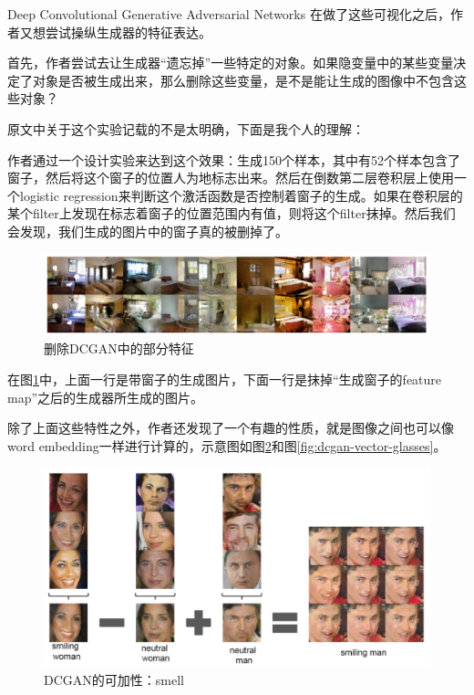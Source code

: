 \documentclass{ctexart}
\begin{document}
\begin{section}{Deep Convolutional Generative Adversarial Networks}
		在做了这些可视化之后，作者又想尝试操纵生成器的特征表达。
		
		首先，作者尝试去让生成器“遗忘掉”一些特定的对象。如果隐变量中的某些变量决定了对象是否被生成出来，那么删除这些变量，是不是能让生成的图像中不包含这些对象？
		
		原文中关于这个实验记载的不是太明确，下面是我个人的理解：
		
		作者通过一个设计实验来达到这个效果：生成150个样本，其中有52个样本包含了窗子，然后将这个窗子的位置人为地标志出来。然后在倒数第二层卷积层上使用一个logistic regression来判断这个激活函数是否控制着窗子的生成。如果在卷积层的某个filter上发现在标志着窗子的位置范围内有值，则将这个filter抹掉。然后我们会发现，我们生成的图片中的窗子真的被删掉了。
		
		\begin{figure}
			\centering
			\includegraphics[width=45em]{figures/DCGAN-visualizing-internals-remove-filter.png}
			\caption{删除DCGAN中的部分特征}
			\label{fig:dcgan-visual-internals-remove-filter}
		\end{figure}
	
		在图\ref{fig:dcgan-visual-internals-remove-filter}中，上面一行是带窗子的生成图片，下面一行是抹掉“生成窗子的feature map”之后的生成器所生成的图片。
		
		除了上面这些特性之外，作者还发现了一个有趣的性质，就是图像之间也可以像word embedding一样进行计算的，示意图如图\ref{fig:dcgan-vector-smell}和图\ref{fig:dcgan-vector-glasses}。
		
		\begin{figure}
			\centering
			\includegraphics[width=35em]{figures/DCGAN-visualizing-internals-vector-1.png}
			\caption{DCGAN的可加性：smell}
			\label{fig:dcgan-vector-smell}
		\end{figure}
	

\end{section}
\end{document}
